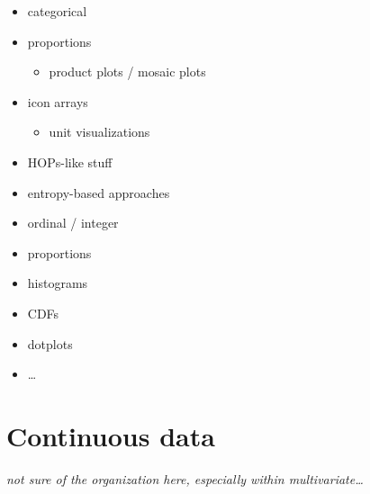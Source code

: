 \documentclass[]{book}
\providecommand{\tightlist}{%
  \setlength{\itemsep}{0pt}\setlength{\parskip}{0pt}}
\theoremstyle{definition}
\theoremstyle{definition}
\theoremstyle{definition}
\theoremstyle{remark}
\begin{document}
\begin{itemize}
\tightlist
\item
  categorical
\item
  proportions

  \begin{itemize}
  \tightlist
  \item
    product plots / mosaic plots
  \end{itemize}
\item
  icon arrays

  \begin{itemize}
  \tightlist
  \item
    unit visualizations
  \end{itemize}
\item
  HOPs-like stuff
\item
  entropy-based approaches
\item
  ordinal / integer
\item
  proportions
\item
  histograms
\item
  CDFs
\item
  dotplots
\item
  \ldots{}
\end{itemize}

\chapter{Continuous data}\label{ch-continuous}

\emph{not sure of the organization here, especially within
multivariate\ldots{}}
\end{document}
